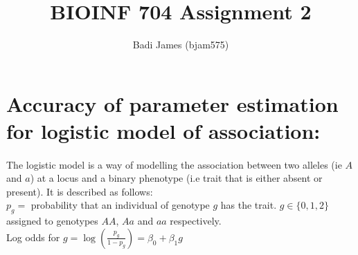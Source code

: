 \documentclass{article}
\title{\vspace{-2.0cm}BIOINF 704 Assignment 2}
\author{Badi James (bjam575)}
\begin{document}
	
	\maketitle
	
	\section{Accuracy of parameter estimation for logistic model of association:}
	
	\paragraph{}The logistic model is a way of modelling the association between two alleles (ie $A$ and $a$) at a locus and a binary phenotype (i.e trait that is either absent or present). It is described as follows: \\
	$p_g =$ probability that an individual of genotype $g$ has the trait. $g \in \{0,1,2\}$ assigned to genotypes $AA$, $Aa$ and $aa$ respectively. \\
	Log odds for $g = \log(\frac{p_g}{1 - p_g}) = \beta_0 + \beta_1 g$
	
\end{document}
